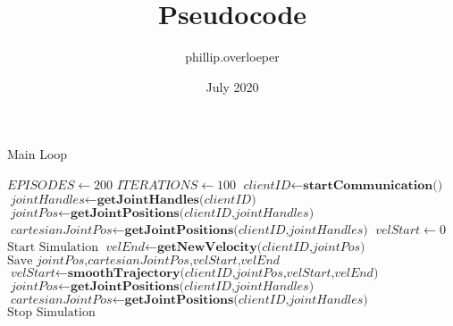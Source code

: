 \documentclass{article}
\title{Pseudocode}
\author{phillip.overloeper }
\date{July 2020}
\begin{document}
\begin{algorithm}
\caption{Main Loop}\label{euclid}
\begin{algorithmic}[1]
\State $\textit{EPISODES} \gets 200$
\State $\textit{ITERATIONS} \gets 100$
\State $\textit{clientID} \gets \textbf{startCommunication()}$
\State $\textit{jointHandles} \gets \textbf{getJointHandles(}\textit{clientID}\textbf{)}$
\State $\textit{jointPos} \gets \textbf{getJointPositions(}\textit{clientID,jointHandles}\textbf{)}$
\State $\textit{cartesianJointPos} \gets \textbf{getJointPositions(}\textit{clientID,jointHandles}\textbf{)}$
\State $\textit{velStart} \gets 0$
\\
\State $\text{Start Simulation}$
    \State $\textit{velEnd} \gets \textbf{getNewVelocity(}\textit{clientID,jointPos}\textbf{)}$
    \\
    \State $\text{Save } \textit{jointPos,cartesianJointPos,velStart,velEnd}$
    \\
    \State $\textit{velStart} \gets \textbf{smoothTrajectory(}\textit{clientID,jointPos,velStart,velEnd}\textbf{)}$
    \State $\textit{jointPos} \gets \textbf{getJointPositions(}\textit{clientID,jointHandles}\textbf{)}$
    \State $\textit{cartesianJointPos} \gets \textbf{getJointPositions(}\textit{clientID,jointHandles}\textbf{)}$
    \\
    \State $\text{Stop Simulation}$
    \EndFor


\EndFor
\EndProcedure
\end{algorithmic}
\end{algorithm}
\end{document}
